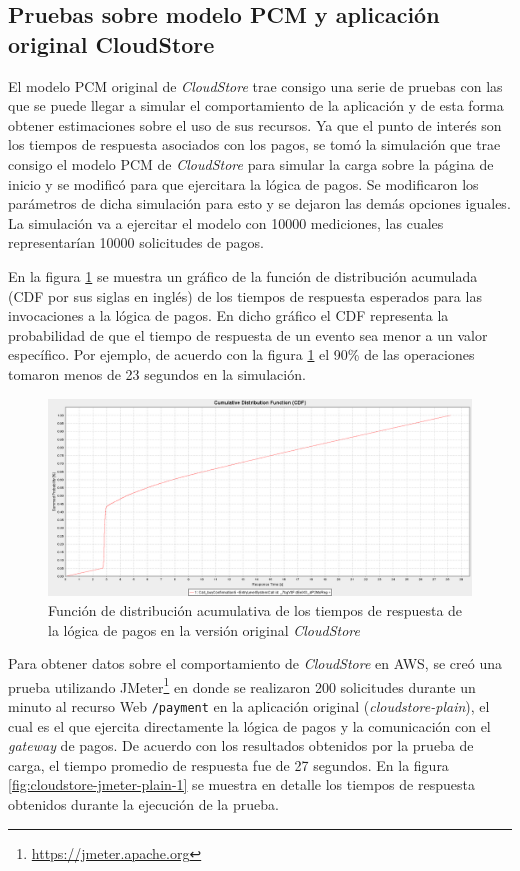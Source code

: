 \documentclass[article]{IEEEtran}
\begin{document}
\subsection{Pruebas sobre modelo PCM y aplicación original CloudStore} \label{sec:pruebas-1}
El modelo PCM original de \emph{CloudStore} trae consigo una serie de pruebas con las que se puede llegar a simular el comportamiento de la aplicación y de esta forma obtener estimaciones sobre el uso de sus recursos. Ya que el punto de interés son los tiempos de respuesta asociados con los pagos, se tomó la simulación que trae consigo el modelo PCM de \emph{CloudStore} para simular la carga sobre la página de inicio y se modificó para que ejercitara la lógica de pagos. Se modificaron los parámetros de dicha simulación para esto y se dejaron las demás opciones iguales. La simulación va a ejercitar el modelo con 10000 mediciones, las cuales representarían 10000 solicitudes de pagos.

En la figura \ref{fig:cloudstore-pcm-1} se muestra un gráfico de la función de distribución acumulada (CDF por sus siglas en inglés) de los tiempos de respuesta esperados para las invocaciones a la lógica de pagos. En dicho gráfico el CDF representa la probabilidad de que el tiempo de respuesta de un evento sea menor a un valor específico. Por ejemplo, de acuerdo con la figura \ref{fig:cloudstore-pcm-1} el 90\% de las operaciones tomaron menos de 23 segundos en la simulación.

\begin{figure}[h]
  \centering
  \includegraphics[width=17cm]{cloudstore-plain-cdf-1}
  \caption{\small{Función de distribución acumulativa de los tiempos de respuesta de la lógica de pagos en la versión original \emph{CloudStore}}}
  \label{fig:cloudstore-pcm-1}
\end{figure}

Para obtener datos sobre el comportamiento de \emph{CloudStore} en AWS, se creó una prueba utilizando JMeter\footnote{\url{https://jmeter.apache.org}} en donde se realizaron 200 solicitudes durante un minuto al recurso Web \texttt{/payment} en la aplicación original (\emph{cloudstore-plain}), el cual es el que ejercita directamente la lógica de pagos y la comunicación con el \emph{gateway} de pagos. De acuerdo con los resultados obtenidos por la prueba de carga, el tiempo promedio de respuesta fue de 27 segundos. En la figura  \ref{fig:cloudstore-jmeter-plain-1} se muestra en detalle los tiempos de respuesta obtenidos durante la ejecución de la prueba.
\end{document}
